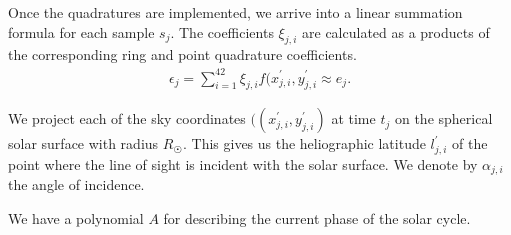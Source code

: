 \documentclass{aa}
\newcommand{\eqnl}[2]{\begin{eqnarray}\label{#1}#2\end{eqnarray}}
\begin{document}
  Once the quadratures are implemented, we arrive into a linear summation formula for each sample $s_j$. The coefficients $\xi_{j,i}$ are calculated as a products of the corresponding ring and point quadrature coefficients.
  \eqnl{inversion_beam3}{
  \epsilon_j = \sum \limits_{i=1}^{42} \xi_{j,i} f(x^{\prime}_{j,i}, y^{\prime}_{j,i} \approx e_j \text{.}
  }

   We project each of the sky coordinates $((x^{\prime}_{j,i}, y^{\prime}_{j,i})$ at time $t_j$ on the spherical solar 
   surface with radius $R_{\astrosun}$. This gives us the heliographic latitude $l^{\prime}_{j,i}$ of the point where the line of sight is incident with the solar surface. We denote by $\alpha_{j,i}$ the angle of incidence.
   
  We have a polynomial $A$ for describing the current phase of the solar 
   cycle.
   


\begin{acknowledgements}
\end{acknowledgements}
\end{document}
